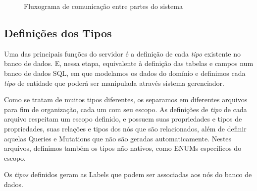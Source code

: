  \begin{figure}[H]

\caption{Fluxograma de comunicação entre partes do sistema }
\label{chap3:fluxograma}
\end{figure}

\subsection{Definições dos Tipos}

Uma das principais funções do servidor é a definição de cada \textit{tipo} existente no banco de dados. E, nessa etapa, equivalente à definição das tabelas e campos num banco de dados SQL, em que modelamos os dados do domínio e definimos cada \textit{tipo} de entidade que poderá ser manipulada através sistema gerenciador.

Como se tratam de muitos tipos diferentes, os separamos em diferentes arquivos para fim de organização, cada um com seu escopo. As definições de \textit{tipo} de cada arquivo respeitam um escopo definido, e possuem suas propriedades e tipos de propriedades, suas relações e tipos dos nós que são relacionados, além de definir aquelas Queries e Mutations que não são geradas automaticamente. Nestes arquivos, definimos também os tipos não nativos, como ENUMs específicos do escopo.

Os \textit{tipos} definidos geram as Labels que podem ser associadas aos nós do banco de dados.

